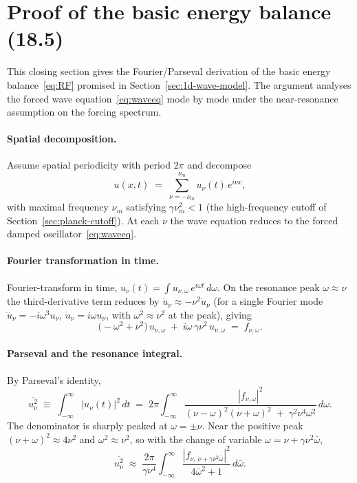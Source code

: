 \section{Proof of the basic energy balance (18.5)}\label{sec:RF-proof-details}

This closing section gives the Fourier/Parseval derivation of the basic energy balance~\eqref{eq:RF} promised in Section~\ref{sec:1d-wave-model}. The argument analyses the forced wave equation~\eqref{eq:waveeq} mode by mode under the near-resonance assumption on the forcing spectrum.

\paragraph{Spatial decomposition.}
Assume spatial periodicity with period $2\pi$ and decompose
\begin{equation}\label{eq:rf-spatial}
u(x, t) \;=\; \sum_{\nu = -\nu_m}^{\nu_m} u_\nu(t)\, e^{i\nu x},
\end{equation}
with maximal frequency $\nu_m$ satisfying $\gamma\nu_m^2 < 1$ (the high-frequency cutoff of Section~\ref{sec:planck-cutoff}). At each $\nu$ the wave equation reduces to the forced damped oscillator~\eqref{eq:waveeq}.

\paragraph{Fourier transformation in time.}
Fourier-transform in time, $u_\nu(t) = \int u_{\nu,\omega}\, e^{i\omega t}\, d\omega$. On the resonance peak $\omega \approx \nu$ the third-derivative term reduces by $\dddot u_\nu \approx -\nu^2\dot u_\nu$ (for a single Fourier mode $\dddot u_\nu = -i\omega^3 u_\nu$, $\dot u_\nu = i\omega u_\nu$, with $\omega^2 \approx \nu^2$ at the peak), giving
\begin{equation}\label{eq:rf-fourier}
\bigl(-\omega^2 + \nu^2\bigr)\, u_{\nu,\omega} \;+\; i\omega\, \gamma\nu^2\, u_{\nu,\omega} \;=\; f_{\nu,\omega}.
\end{equation}

\paragraph{Parseval and the resonance integral.}
By Parseval's identity,
\begin{equation}\label{eq:rf-parseval}
\overline{u_\nu^2} \;\equiv\; \int_{-\infty}^{\infty} |u_\nu(t)|^2\, dt
\;=\; 2\pi \int_{-\infty}^{\infty} \frac{|f_{\nu,\omega}|^2}{(\nu - \omega)^2 (\nu + \omega)^2 \;+\; \gamma^2 \nu^4 \omega^2}\, d\omega.
\end{equation}
The denominator is sharply peaked at $\omega = \pm\nu$. Near the positive peak $(\nu + \omega)^2 \approx 4\nu^2$ and $\omega^2 \approx \nu^2$, so with the change of variable $\omega = \nu + \gamma\nu^2\bar\omega$,
\[
\overline{u_\nu^2} \;\approx\; \frac{2\pi}{\gamma\nu^4} \int_{-\infty}^{\infty} \frac{|f_{\nu,\,\nu + \gamma\nu^2\bar\omega}|^2}{4\bar\omega^2 + 1}\, d\bar\omega .
\]

